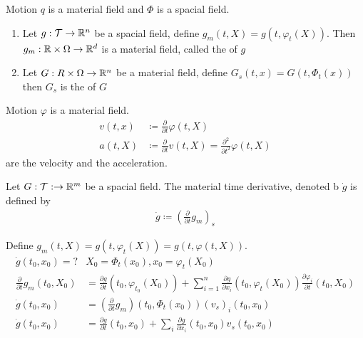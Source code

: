 \begin{example}
    Motion \(q\) is a material field and \(\Phi\) is a spacial field.
\end{example}

\begin{definition}\label{def:1.14}
    \begin{enumerate}
        \item Let \(g:\mathcal{T}\to\mathbb{R}^n\) be a spacial field, define \(g_m(t,X)=g(t,\varphi_t(X))\). Then \(g_m:\mathbb{R}\times \Omega\to\mathbb{R}^d\) is a material field, called the  of \(g\)
        \item Let \(G:R\times \Omega\to\mathbb{R}^n\) be a material field, define \(G_s(t,x)=G(t,\Phi_t(x))\) then \(G_s\) is the  of \(G\)
    \end{enumerate}
\end{definition}

Motion \(\varphi\) is a material field. 
\begin{align*}
    v(t,x)&\coloneqq\frac{\partial}{\partial t}\varphi(t,X)\\
    a(t,X)&\coloneqq \frac{\partial}{\partial t} v(t,X)=\frac{\partial^2}{\partial t^2}\varphi(t,X)
\end{align*}
are the velocity and the acceleration.

\begin{definition}\label{def:1.15}
    Let \(G:\mathcal{T}:\to\mathbb{R}^m\) be a spacial field. The material time derivative, denoted b 
    \(\dot{g}\) is defined by 
    \begin{align*}
        \dot{g}\coloneqq \left(\frac{\partial }{\partial t} g_m\right)_s
    \end{align*}
\end{definition}

Define \(g_m(t,X)=g(t,\varphi_t(X))=g(t,\varphi(t,X))\).
\begin{align*}
    \dot{g}(t_0,x_0)=? & X_0=\Phi_t(x_0), x_0=\varphi_t(X_0)\\
    \frac{\partial}{\partial t} g_m(t_0,X_0) & = \frac{\partial g}{\partial t}(t_0,\varphi_{t_0}(X_0))+\sum_{i=1}^n\frac{\partial g}{\partial x_i}(t_0,\varphi_t(X_0))\frac{\partial \varphi_i}{\partial t}(t_0,X_0) \\
    \dot{g}(t_0,x_0)&=\left(\frac{\partial}{\partial t}g_m\right)(t_0,\Phi_t(x_0))(v_s)_{i}(t_0,x_0)\\
    \dot{g}(t_0,x_0)&= \frac{\partial g}{\partial t}(t_0,x_0)+\sum_{i}\frac{\partial g}{\partial x_i}(t_0,x_0)v_s(t_0,x_0)
\end{align*}

